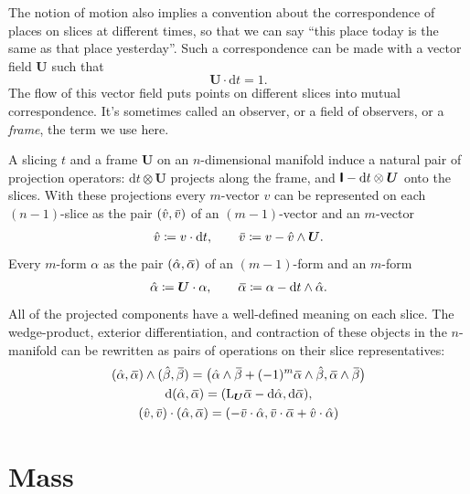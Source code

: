 \documentclass[\ifafour a4paper,12pt,\else a5paper,10pt,\fi%
onecolumn,oneside,article,%
british%
]{memoir}
\theoremstyle{remark}
\theoremstyle{innote}
\newcommand*{\citep}{\parencites}
\newcommand*{\di}{\mathrm{d}}%
\newcommand*{\defd}{\coloneqq}
\renewcommand*{\|}{\nonscript\,\vert\nonscript\;\mathopen{}}
\newcommand*{\sect}{\S}%
\newcommand*{\widebar}[1]{{\mkern1.5mu\skew{2}\overline{\mkern-1.5mu#1\mkern-1.5mu}\mkern 1.5mu}}
\newcommand*{\Li}{\mathrm{L}}
\newcommand*{\yrr}{M}
\newcommand*{\yr}{\bm{\yrr}}
\newcommand*{\ycc}{u}
\newcommand*{\yc}{\bm{\ycc}}
\newcommand*{\yFF}{U}
\newcommand*{\yF}{\bm{\yFF}}
\newcommand*{\yI}{\textsf{\textbf{I}}}
\newcommand*{\yah}{\Hat{\alpha}}
\newcommand*{\yaw}{\widebar{\alpha}}
\newcommand*{\ybh}{\Hat{\beta}}
\newcommand*{\ybw}{\widebar{\beta}}
\newcommand*{\yvh}{\Hat{v}}
\newcommand*{\yvw}{\widebar{v}}
\begin{document}
The notion of motion also implies a convention about the correspondence of
places on slices at different times, so that we can say \enquote{this place
  today is the same as that place yesterday}. Such a correspondence can be
made with a vector field $\yF$ such that
\begin{equation}
  \label{eq:observer_field_unit-time}
  \yF \cdot \di t = 1.
\end{equation}
The flow of this vector field puts points on different slices into mutual
correspondence. It's sometimes called an observer, or a field of observers,
or a \emph{frame}, the term we use here.

A slicing $t$ and a frame $\yF$ on an $n$-dimensional manifold induce a
natural pair of projection operators: $\di t\otimes\yF$ projects along the
frame, and $\yI - \di t \otimes\yF$ onto the slices. With these projections
every $m$-vector $v$ can be represented on each $(n-1)$-slice as the pair
$(\yvh, \yvw)$ of an $(m-1)$-vector and an $m$-vector
\begin{equation}
  \label{eq:projection_vector}
  \yvh \defd v\cdot \di t,
  \qquad
  \yvw \defd v - \yvh\land \yF.
\end{equation}
Every $m$-form $\alpha$ as the pair $(\yah, \yaw)$ of an $(m-1)$-form and
an $m$-form
\begin{equation}
  \label{eq:projection_form}
  \yah \defd \yF \cdot \alpha,
  \qquad
  \yaw \defd \alpha - \di t \land \yah.
\end{equation}
All of the projected components have a well-defined meaning on each slice.
The wedge-product, exterior differentiation, and contraction of these
objects in the $n$-manifold can be rewritten
\citep[\sect~B.1.4]{hehletal2003} as pairs of operations on their slice
representatives:
\begin{gather}
  \label{eq:wedge_projection}
  (\yah, \yaw) \land (\ybh, \ybw) = \bigl(
  \yah \land \ybw +(-1)^m \yaw \land \ybh,
  \yaw \land \ybw \bigr)
  \\
  \label{eq:d_projection}
  \di(\yah, \yaw) = ( \Li_{\yF}\yaw - \di\yah, \di\yaw),
  \\
  \label{eq:contraction_projection}
  (\yvh, \yvw) \cdot (\yah, \yaw) =
  (-\yvw \cdot \yah, \yvw \cdot \yaw + \yvh \cdot \yah)
\end{gather}


\section{Mass}
\label{sec:mass}
\end{document}
